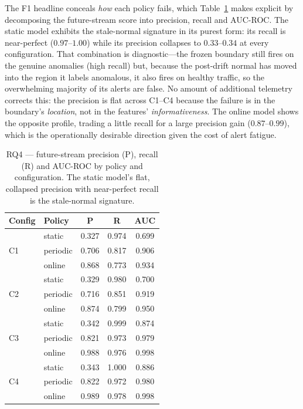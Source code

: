 \documentclass[acmsmall]{acmart}
\begin{document}
The F1 headline conceals \emph{how} each policy fails, which Table~\ref{tab:rq4-prf} makes explicit by decomposing the future-stream score into precision, recall and AUC-ROC. The static model exhibits the stale-normal signature in its purest form: its recall is near-perfect ($0.97$--$1.00$) while its precision collapses to $0.33$--$0.34$ at every configuration. That combination is diagnostic---the frozen boundary still fires on the genuine anomalies (high recall) but, because the post-drift normal has moved into the region it labels anomalous, it also fires on healthy traffic, so the overwhelming majority of its alerts are false. No amount of additional telemetry corrects this: the precision is flat across C1--C4 because the failure is in the boundary's \emph{location}, not in the features' \emph{informativeness}. The online model shows the opposite profile, trading a little recall for a large precision gain ($0.87$--$0.99$), which is the operationally desirable direction given the cost of alert fatigue.

\begin{table}[t]
\caption{RQ4 --- future-stream precision (P), recall (R) and AUC-ROC by policy and configuration. The static model's flat, collapsed precision with near-perfect recall is the stale-normal signature.}\label{tab:rq4-prf}
\begin{tabular}{@{}llccc@{}}
\toprule
Config & Policy & P & R & AUC \\
\midrule
\multirow{3}{*}{C1}
 & static   & 0.327 & 0.974 & 0.699 \\
 & periodic & 0.706 & 0.817 & 0.906 \\
 & online   & 0.868 & 0.773 & 0.934 \\
\midrule
\multirow{3}{*}{C2}
 & static   & 0.329 & 0.980 & 0.700 \\
 & periodic & 0.716 & 0.851 & 0.919 \\
 & online   & 0.874 & 0.799 & 0.950 \\
\midrule
\multirow{3}{*}{C3}
 & static   & 0.342 & 0.999 & 0.874 \\
 & periodic & 0.821 & 0.973 & 0.979 \\
 & online   & 0.988 & 0.976 & 0.998 \\
\midrule
\multirow{3}{*}{C4}
 & static   & 0.343 & 1.000 & 0.886 \\
 & periodic & 0.822 & 0.972 & 0.980 \\
 & online   & 0.989 & 0.978 & 0.998 \\
\bottomrule
\end{tabular}
\end{table}
\end{document}
